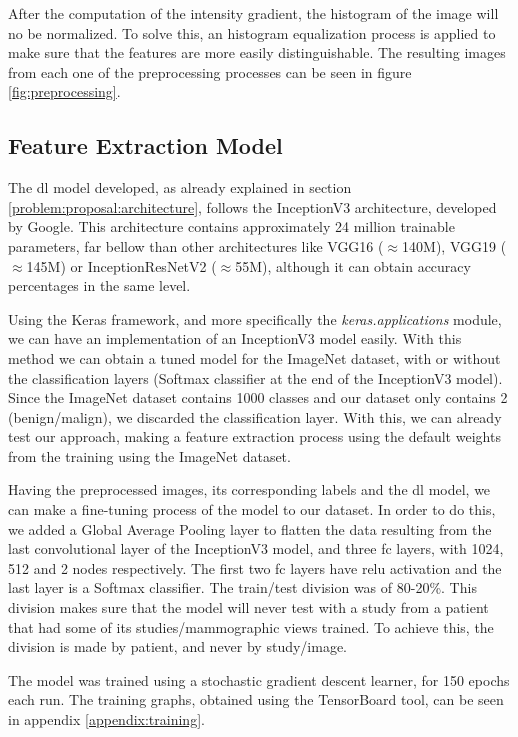 \documentclass[
  twoside,
  11pt, a4paper,
  footinclude=true,
  headinclude=true,
  cleardoublepage=empty
]{scrbook}
\begin{document}
          After the computation of the intensity gradient, the histogram of the image will no be normalized. To solve this, an histogram equalization process is applied to make sure that the features are more easily distinguishable. The resulting images from each one of the preprocessing processes can be seen in figure \ref{fig:preprocessing}.

      \subsection{Feature Extraction Model}
        The \gls{dl} model developed, as already explained in section \ref{problem:proposal:architecture}, follows the InceptionV3 architecture, developed by Google. This architecture contains approximately 24 million trainable parameters, far bellow than other architectures like VGG16 ($\approx$140M), VGG19 ($\approx$145M) or InceptionResNetV2 ($\approx$55M), although it can obtain accuracy percentages in the same level.

        Using the Keras framework, and more specifically the \textit{keras.applications} module, we can have an implementation of an InceptionV3 model easily. With this method we can obtain a tuned model for the ImageNet dataset, with or without the classification layers (Softmax classifier at the end of the InceptionV3 model). Since the ImageNet dataset contains 1000 classes and our dataset only contains 2 (benign/malign), we discarded the classification layer. With this, we can already test our approach, making a feature extraction process using the default weights from the training using the ImageNet dataset.

        Having the preprocessed images, its corresponding labels and the \gls{dl} model, we can make a fine-tuning process of the model to our dataset. In order to do this, we added a Global Average Pooling layer to flatten the data resulting from the last convolutional layer of the InceptionV3 model, and three \gls{fc} layers, with 1024, 512 and 2 nodes respectively. The first two \gls{fc} layers have \gls{relu} activation and the last layer is a Softmax classifier. The train/test division was of 80-20\%. This division makes sure that the model will never test with a study from a patient that had some of its studies/mammographic views trained. To achieve this, the division is made by patient, and never by study/image.

        The model was trained using a stochastic gradient descent learner, for 150 epochs each run. The training graphs, obtained using the TensorBoard tool, can be seen in appendix \ref{appendix:training}.
\end{document}
